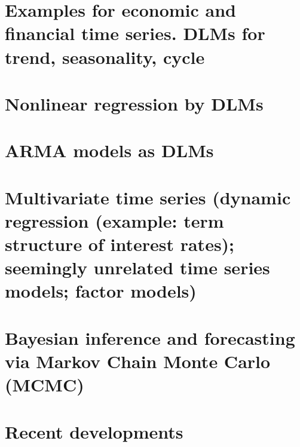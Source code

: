 \documentclass[dvipsnames,12pt]{book}
\begin{document}
    \chapter[DLMs for trend, seasonality, cycle]{Examples for economic and financial time series. DLMs for trend, seasonality, cycle}

    \chapter{Nonlinear regression by DLMs}

    \chapter{ARMA models as DLMs}

    \chapter[Multivariate time series]{Multivariate time series (dynamic regression (example: term structure of interest rates); seemingly unrelated time series models; factor models)}

    \chapter[Markov Chain Monte Carlo]{Bayesian inference and forecasting via Markov Chain Monte Carlo (MCMC)}
     
    \chapter{Recent developments}
\end{document}
